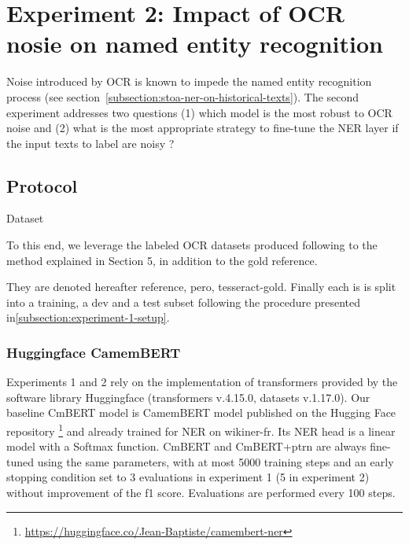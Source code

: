 \section{Experiment 2: Impact of OCR nosie on named entity recognition}
\label{sec:ner-xp2}
Noise introduced by OCR is known to impede the named entity recognition process (see section~\ref{subsection:stoa-ner-on-historical-texts}).
The second experiment addresses two questions (1) which model is the most robust to OCR noise and (2) what is the most appropriate strategy to fine-tune the NER layer if the input texts to label are noisy ?

\subsection{Protocol}

Dataset

To this end, we leverage the labeled OCR datasets produced following to the method explained in Section 5, in addition to the gold reference.

They are denoted hereafter {reference, pero, tesseract}-gold.
Finally each is is split into a training, a dev and a test subset following the procedure presented in\cref{subsection:experiment-1-setup}.





\subsubsection{Huggingface CamemBERT}

Experiments 1 and 2 rely on the implementation of transformers provided by the software library Huggingface (transformers v.4.15.0, datasets v.1.17.0).
Our baseline CmBERT model is CamemBERT model published on the Hugging Face repository \footnote{\url{https://huggingface.co/Jean-Baptiste/camembert-ner}} and already trained for NER on wikiner-fr.
Its NER head is a linear model with a Softmax function.
CmBERT and CmBERT+ptrn are always fine-tuned using the same parameters, with at most 5000 training steps and an early stopping condition set to 3 evaluations in experiment 1 (5 in experiment 2) without improvement of the f1 score. Evaluations are performed every 100 steps.

